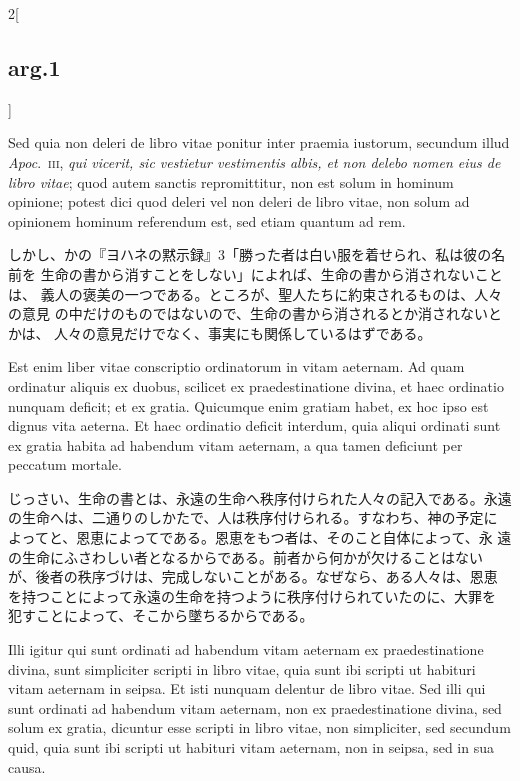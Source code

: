 \documentclass[paper=a4paper,fontsize=10pt,jafontsize=9pt,titlepage]{jlreq}
\begin{document}
\begin{paracol}{2}[\subsection{arg.1}]
\switchcolumn*

Sed quia non deleri de libro vitae ponitur inter praemia
iustorum, secundum illud {\itshape Apoc}.~{\scshape iii}, {\itshape qui vicerit, sic vestietur
vestimentis albis, et non delebo nomen eius de libro vitae}; quod autem
sanctis repromittitur, non est solum in hominum opinione; potest dici
quod deleri vel non deleri de libro vitae, non solum ad opinionem
hominum referendum est, sed etiam quantum ad rem.

\switchcolumn

しかし、かの『ヨハネの黙示録』3「勝った者は白い服を着せられ、私は彼の名前を
 生命の書から消すことをしない」によれば、生命の書から消されないことは、
 義人の褒美の一つである。ところが、聖人たちに約束されるものは、人々の意見
 の中だけのものではないので、生命の書から消されるとか消されないとかは、
 人々の意見だけでなく、事実にも関係しているはずである。

\switchcolumn*

Est enim liber vitae
conscriptio ordinatorum in vitam aeternam. Ad quam ordinatur aliquis ex
duobus, scilicet ex praedestinatione divina, et haec ordinatio nunquam
deficit; et ex gratia. Quicumque enim gratiam habet, ex hoc ipso est
dignus vita aeterna. Et haec ordinatio deficit interdum, quia aliqui
ordinati sunt ex gratia habita ad habendum vitam aeternam, a qua tamen
deficiunt per peccatum mortale.

\switchcolumn

じっさい、生命の書とは、永遠の生命へ秩序付けられた人々の記入である。永遠
 の生命へは、二通りのしかたで、人は秩序付けられる。すなわち、神の予定に
 よってと、恩恵によってである。恩恵をもつ者は、そのこと自体によって、永
 遠の生命にふさわしい者となるからである。前者から何かが欠けることはない
 が、後者の秩序づけは、完成しないことがある。なぜなら、ある人々は、恩恵
 を持つことによって永遠の生命を持つように秩序付けられていたのに、大罪を
 犯すことによって、そこから墜ちるからである。

\switchcolumn*

Illi igitur qui sunt ordinati ad
habendum vitam aeternam ex praedestinatione divina, sunt simpliciter
scripti in libro vitae, quia sunt ibi scripti ut habituri vitam aeternam
in seipsa. Et isti nunquam delentur de libro vitae. Sed illi qui sunt
ordinati ad habendum vitam aeternam, non ex praedestinatione divina, sed
solum ex gratia, dicuntur esse scripti in libro vitae, non simpliciter,
sed secundum quid, quia sunt ibi scripti ut habituri vitam aeternam, non
in seipsa, sed in sua causa.


\end{paracol}
\end{document}
